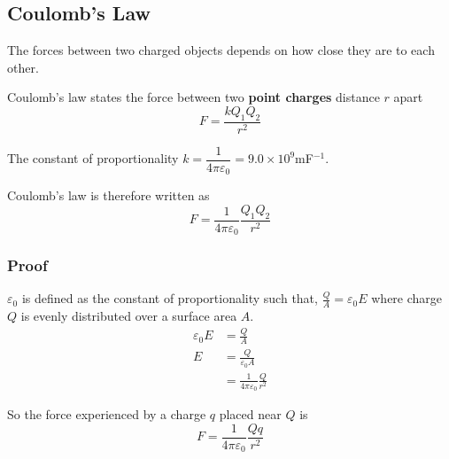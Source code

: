\subsection{Coulomb's Law}

The forces between two charged objects depends on how close they are to each other.

Coulomb's law states the force between two \textbf{point charges} distance $r$ apart
$$F=\frac{kQ_1Q_2}{r^2}$$

The constant of proportionality $k=\dfrac{1}{4\pi\varepsilon_0}=9.0\times10^9$mF$^{-1}$.

Coulomb's law is therefore written as
$$F=\frac{1}{4\pi\varepsilon_0}\frac{Q_1Q_2}{r^2}$$

\subsubsection*{Proof}
$\varepsilon_0$ is defined as the constant of proportionality such that, $\frac{Q}{A}=\varepsilon_0E$ where charge $Q$ is evenly distributed over a surface area $A$.
\begin{align*}
    \varepsilon_0E&=\frac{Q}{A}\\
                 E&=\frac{Q}{\varepsilon_0A}\\
                  &=\frac{1}{4\pi\varepsilon_0}\frac{Q}{r^2}
\end{align*}

So the force experienced by a charge $q$ placed near $Q$ is
$$F=\frac{1}{4\pi\varepsilon_0}\frac{Qq}{r^2}$$
